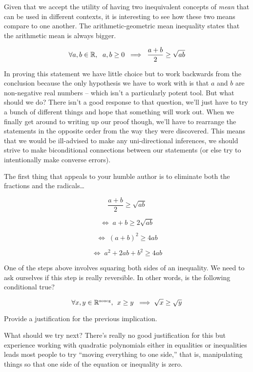 Given that we accept the utility of having two inequivalent concepts
of \emph{mean} that can be used in different contexts, it is interesting
to see how these two means compare to one another.  The 
arithmetic-geometric mean inequality states that the arithmetic mean 
is always bigger.

\[ \forall a,b \in \Reals, \rule{6pt}{0pt}  a,b \geq 0 \; \implies \;  \frac{a+b}{2} \geq \sqrt{ab} \]

In proving this statement we have little choice but to work backwards
from the conclusion because the only hypothesis we have to work with
is that $a$ and $b$ are non-negative real numbers -- which isn't a 
particularly potent tool. But what should we do?  
There isn't a good response to that 
question, we'll just have to try a bunch of different things and hope
that something will work out.  When we finally get around to writing up
our proof though, we'll have to rearrange the statements in the opposite 
order from the way they were discovered.  This means that we would 
be ill-advised to make any uni-directional inferences, we should 
strive to make biconditional connections between our statements
(or else try to intentionally make converse errors).

The first thing that appeals to your humble author is to eliminate
both the fractions and the radicals\ldots

\[ \frac{a+b}{2} \geq \sqrt{ab} \]

\[ \iff \; a+b \geq 2\sqrt{ab} \]

\[ \iff \; (a+b)^2 \geq 4ab \] 

\[ \iff \; a^2+2ab+b^2 \geq 4ab \] 

One of the steps above involves squaring both sides of an inequality.
We need to ask ourselves if this step is really reversible.  In other
words, is the following conditional true?

\[ \forall x,y \in {\mathbb R}^{\mbox{\tiny noneg}}, \, \; 
x \geq y \; \implies \sqrt{x} \geq \sqrt{y} \]

\begin{exer} 
Provide a justification for the previous implication.
\end{exer}

What should we try next?  There's really no good justification for
this but experience working with quadratic polynomials either in 
equalities or inequalities leads most people to try ``moving everything
to one side,'' that is, manipulating things so that one side of the 
equation or inequality is zero.


